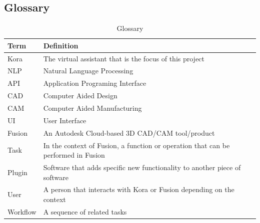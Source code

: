 \documentclass[onecolumn, draftclsnofoot,10pt, compsoc]{IEEEtran}
\def \botname{Kora\xspace}
\begin{document}
	\subsection{Glossary}
	\begin{table}[H]
		\centering
		\caption{Glossary}
		\label{my-label}
		\begin{tabular}{|l|l|}
			\hline
			\textbf{Term} & \textbf{Definition} \\ \hline
			\botname & The virtual assistant that is the focus of this project \\ \hline
			NLP & Natural Language Processing \\ \hline
			API & Application Programing Interface \\ \hline
			CAD & Computer Aided Design \\ \hline
			CAM & Computer Aided Manufacturing \\ \hline
			UI & User Interface \\ \hline
			Fusion & An Autodesk Cloud-based 3D CAD/CAM tool/product \\ \hline
			Task & In the context of Fusion, a function or operation that can be performed in Fusion \\ \hline
			Plugin & Software that adds specific new functionality to another piece of software \\ \hline
			User & A person that interacts with \botname or Fusion depending on the context \\ \hline
			Workflow & A sequence of related tasks \\ \hline
		\end{tabular}
	\end{table}
\end{document}
